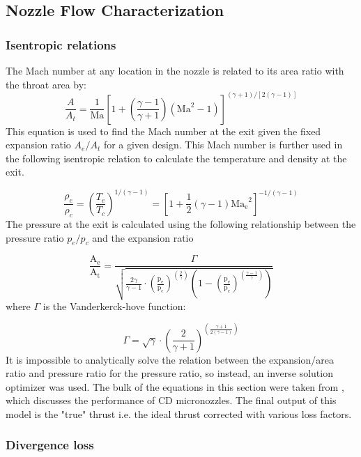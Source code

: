 \documentclass{homework}
\begin{document}
\begin{multicols}{2}
\begin{table}
            \end{table}

\subsection{Nozzle Flow Characterization}

\subsubsection{Isentropic relations}
		    
		  The Mach number at any location in the nozzle is related to its area ratio with the throat area by:  
$$\frac{A}{A_t}=\frac{1}{\mathrm{Ma}}\left[1+\left(\frac{\gamma-1}{\gamma+1}\right)\left(\mathrm{Ma}^2-1\right)\right]^{(\gamma+1) /[2(\gamma-1)]}$$ 		    
		  This equation is used to find the Mach number at the exit given the fixed expansion ratio $A_e / A_t$ for a given design. This Mach number is further used in the following isentropic relation to calculate the temperature and density at the exit.  
		    
$$ \frac{\rho_e}{\rho_c}=\left(\frac{T_e}{T_c}\right)^{1 /(\gamma-1)}=\left[1+\frac{1}{2}(\gamma-1) \mathrm{Ma_e}^2\right]^{-1 /(\gamma-1)}$$ 		    
		  The pressure at the exit is calculated using the following relationship between the pressure ratio $p_e / p_c$ and the expansion ratio  
		    
$$\frac{\mathrm{A}_{\mathrm{e}}}{\mathrm{A}_{\mathrm{t}}}=\frac{\Gamma}{\sqrt{\frac{2 \gamma}{\gamma-1} \cdot\left(\frac{\mathrm{p}_{\mathrm{e}}}{\mathrm{p}_{\mathrm{c}}}\right)^{\left(\frac{2}{\gamma}\right)}\left(1-\left(\frac{\mathrm{p}_{\mathrm{e}}}{\mathrm{p}_{\mathrm{c}}}\right)^{\left(\frac{\gamma-1}{\gamma}\right)}\right)}}$$ 		    
		  where $\Gamma$ is the Vanderkerck-hove function:  
		    
$$\Gamma=\sqrt{\gamma} \cdot\left(\frac{2}{\gamma+1}\right)^{\left(\frac{\gamma+1}{2(\gamma-1)}\right)}$$ 		    
		  It is impossible to analytically solve the relation between the expansion/area ratio and pressure ratio for the pressure ratio, so instead, an inverse solution optimizer was used.  
The bulk of the equations in this section were taken from \cite{thiam_analytical_2020} , which discusses the performance of CD micronozzles. The final output of this model is the "true" thrust i.e. the ideal thrust corrected with various loss factors.

\subsubsection{Divergence loss}
		    

\end{multicols}
\end{document}
